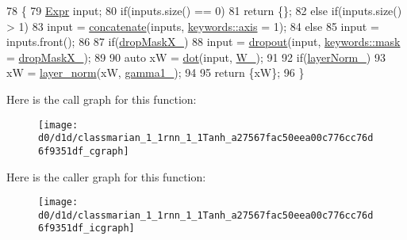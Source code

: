 \begin{DoxyCode}
78                                                      \{
79     \hyperlink{namespacemarian_a498d8baf75b754011078b890b39c8e12}{Expr} input;
80     \textcolor{keywordflow}{if}(inputs.size() == 0)
81       \textcolor{keywordflow}{return} \{\};
82     \textcolor{keywordflow}{else} \textcolor{keywordflow}{if}(inputs.size() > 1)
83       input = \hyperlink{namespacemarian_a2791a2c8f79a938f5cb22ae613680675}{concatenate}(inputs, \hyperlink{namespacemarian_1_1keywords_ace9158eabbddaca833133f12da98b9d6}{keywords::axis} = 1);
84     \textcolor{keywordflow}{else}
85       input = inputs.front();
86 
87     \textcolor{keywordflow}{if}(\hyperlink{classmarian_1_1rnn_1_1Tanh_afd3088eacc5632be9741fd38a36375ed}{dropMaskX\_})
88       input = \hyperlink{namespacemarian_a268400392f22176821c7c4a36733b178}{dropout}(input, \hyperlink{namespacemarian_1_1keywords_a201bea6bea8108889b63081132cc3cd7}{keywords::mask} = \hyperlink{classmarian_1_1rnn_1_1Tanh_afd3088eacc5632be9741fd38a36375ed}{dropMaskX\_});
89 
90     \textcolor{keyword}{auto} xW = \hyperlink{namespacemarian_ad7fbf1ba8e2e04ffdc7d5e4841b5e691}{dot}(input, \hyperlink{classmarian_1_1rnn_1_1Tanh_af63a9f22efde5a4011105da5c416bae9}{W\_});
91 
92     \textcolor{keywordflow}{if}(\hyperlink{classmarian_1_1rnn_1_1Tanh_a2f040a380c52e0d19f84e155d14f3967}{layerNorm\_})
93       xW = \hyperlink{namespacemarian_a6202278a9da8ca8a281a6a96e75082f6}{layer\_norm}(xW, \hyperlink{classmarian_1_1rnn_1_1Tanh_a9391688bd409c4682db1aa1ea35eb45d}{gamma1\_});
94 
95     \textcolor{keywordflow}{return} \{xW\};
96   \}
\end{DoxyCode}


Here is the call graph for this function\+:
\nopagebreak
\begin{figure}[H]
\begin{center}
\leavevmode
\texttt{[image: d0/d1d/classmarian\_1\_1rnn\_1\_1Tanh\_a27567fac50eea00c776cc76d6f9351df\_cgraph]}
\end{center}
\end{figure}




Here is the caller graph for this function\+:
\nopagebreak
\begin{figure}[H]
\begin{center}
\leavevmode
\texttt{[image: d0/d1d/classmarian\_1\_1rnn\_1\_1Tanh\_a27567fac50eea00c776cc76d6f9351df\_icgraph]}
\end{center}
\end{figure}


